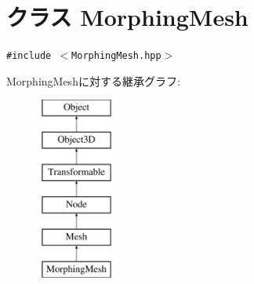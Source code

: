 \hypertarget{classm3g_1_1MorphingMesh}{
\section{クラス MorphingMesh}
\label{classm3g_1_1MorphingMesh}
}
{\tt \#include $<$MorphingMesh.hpp$>$}

MorphingMeshに対する継承グラフ:\begin{figure}[H]
\begin{center}
\leavevmode
\includegraphics[height=6cm]{classm3g_1_1MorphingMesh}
\end{center}
\end{figure}
